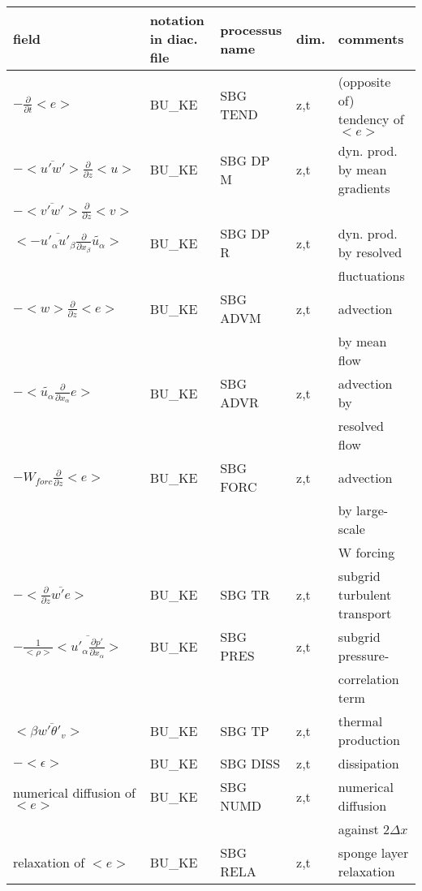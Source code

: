 \begin{center}
\begin{tabular}{||p{5cm}|>{\centering}p{2cm}|>{\centering}p{2.5cm}|>{\centering}p{0.5cm}|p{5.5cm }||}
\hline
\hline
field & notation in diac. file& processus name& dim.  & comments \\
\hline
\hline
$-\frac{\partial }{\partial t}<e>$ & BU\_KE & SBG TEND & z,t & (opposite of) tendency of $<e>$\\
\hline
$-<\overline{u'w'}>\frac{\partial }{\partial z}<u>$ & BU\_KE & SBG DP M & z,t & dyn. prod. by mean gradients \\
$-<\overline{v'w'}>\frac{\partial }{\partial z}<v>$ &  & &  & \\
\hline
$<-\overline{u'_\alpha u'_\beta}\frac{\partial}{\partial x_\beta}\tilde{u_\alpha}>$ & BU\_KE & SBG DP R & z,t & dyn. prod. by resolved \\
 & & & & fluctuations \\
\hline
$-<w>\frac{\partial}{\partial z}<e>$ & BU\_KE & SBG ADVM & z,t & advection \\
 & & & & by mean flow\\
\hline
$-<\tilde{u_\alpha}\frac{\partial}{\partial x_\alpha}e>$ & BU\_KE & SBG ADVR & z,t & advection by\\
 & & & &resolved flow\\
\hline
$-W_{forc}\frac{\partial}{\partial z}<e>$ & BU\_KE & SBG FORC & z,t & advection \\
 & & & & by large-scale\\
 & & & & W forcing\\
\hline
$-<\frac{\partial}{\partial z}\overline{w'e}>$ & BU\_KE & SBG TR   & z,t & subgrid turbulent transport\\
\hline
$- \frac{1}{<\rho>}<\overline{u'_\alpha \frac{\partial p'}{\partial x_\alpha}}>$&
BU\_KE & SBG PRES & z,t & subgrid pressure-\\
 & & & & correlation term\\
\hline
$<\beta  \overline{w'\theta'_v}>$ & BU\_KE & SBG TP   & z,t & thermal production \\
\hline
$-<\epsilon>$ & BU\_KE & SBG DISS & z,t & dissipation \\
\hline
{\rm numerical diffusion of } $<e>$& BU\_KE & SBG NUMD & z,t & numerical diffusion\\
 & & & &against $2\Delta x$ \\
\hline
{\rm relaxation of }$<e>$ & BU\_KE & SBG RELA & z,t& sponge layer relaxation \\

\end{tabular}
\end{center}
